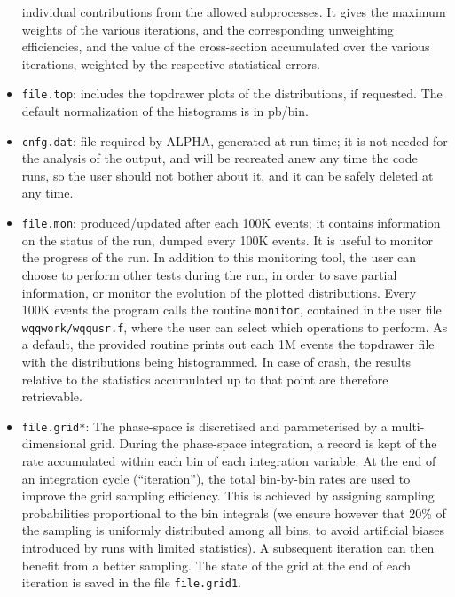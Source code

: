 \documentclass[paper]{JHEP3}
\begin{document}
\begin{appendix}
\begin{itemize}
  individual contributions from the allowed subprocesses. It gives the
  maximum weights of the various iterations, and the corresponding
  unweighting efficiencies, and the value of the cross-section
  accumulated over the various iterations, weighted by the respective
  statistical errors.
\item {\tt file.top}: includes the topdrawer plots of the
  distributions, if requested. The default normalization of the
  histograms is in pb/bin.
\item {\tt cnfg.dat}: file required by ALPHA, generated at run time;
         it is not needed for the
         analysis of the output, and will be recreated anew any time
         the code runs, so the user should not bother about it, and
         it can be safely deleted at any time.
\item {\tt file.mon}: produced/updated after each 100K events;
       it  contains information on the status of the
         run, dumped  every 100K events. It is useful to monitor the
         progress  of the run. In addition to this monitoring tool,
         the user can choose to perform other tests during the run, in
         order to save partial information, or monitor the evolution
         of the plotted distributions. Every 100K events the program
         calls the routine {\tt monitor}, contained in the user file {\tt
           wqqwork/wqqusr.f}, where the user can select which
         operations to perform. As a default, the provided routine
         prints out each 1M events the topdrawer file with the
         distributions being histogrammed. In case of crash, the
         results relative to the statistics accumulated up to that
         point  are therefore retrievable.
\item {\tt file.grid*}: The phase-space is discretised and
         parameterised by a multi-dimensional grid. During the
         phase-space integration, a record is kept of the rate
         accumulated within each bin of each integration variable. At
         the end of an integration cycle (``iteration''), the
         total bin-by-bin rates are used to improve the grid
         sampling efficiency. This is achieved by assigning sampling
         probabilities proportional to the bin integrals (we ensure
         however that 20\% of the sampling is uniformly distributed
         among all bins, to avoid artificial biases introduced by runs
         with limited statistics). A subsequent iteration can then
         benefit from a better sampling. The state of the grid at the
         end of each iteration is saved in the file {\tt file.grid1}.

\end{itemize}
\end{appendix}
\end{document}
